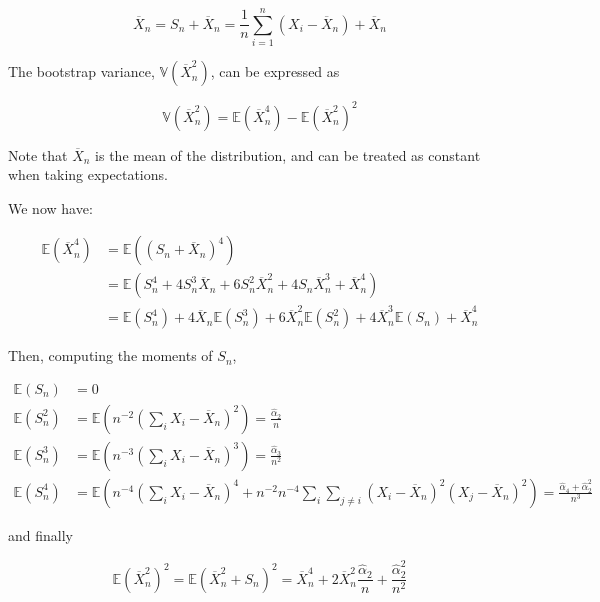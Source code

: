 \[ \overline{X}_{n} = S_{n} + \overline{X}_{n} = \frac{1}{n} \sum_{i=1}^{n} (X_{i} - \overline{X}_{n}) + \overline{X}_{n} \]

The bootstrap variance, \(\mathbb{V}\left(\overline{X}_{n}^{2}\right)\), can
be expressed as

\[ \mathbb{V}\left(\overline{X}_{n}^{2}\right) = \mathbb{E}\left(\overline{X}_{n}^{4}\right) - \mathbb{E}\left(\overline{X}_{n}^{2}\right)^{2} \]

Note that \(\overline{X}_{n}\) is the mean of the distribution, and can be
treated as constant when taking expectations.

We now have:

\begin{align*}
\mathbb{E}\left(\overline{X}_{n}^{4}\right) &= \mathbb{E}\left( (S_{n} + \overline{X}_{n})^{4} \right) \\
&= \mathbb{E}\left( S_{n}^{4} + 4 S_{n}^{3} \overline{X}_{n} + 6 S_{n}^{2} \overline{X}_{n}^{2} + 4 S_{n} \overline{X}_{n}^{3} + \overline{X}_{n}^{4} \right) \\
&= \mathbb{E}(S_{n}^{4}) + 4 \overline{X}_{n} \mathbb{E}(S_{n}^{3}) + 6 \overline{X}_{n}^{2} \mathbb{E}(S_{n}^{2}) + 4 \overline{X}_{n}^{3} \mathbb{E}(S_{n}) + \overline{X}_{n}^{4}
\end{align*}

Then, computing the moments of \(S_{n}\),

\begin{align*}
\mathbb{E}(S_{n}) &= 0 \\
\mathbb{E}(S_{n}^{2}) &= \mathbb{E}\left( n^{-2} \left( \sum_{i} X_{i} - \overline{X}_{n} \right)^{2} \right) = \frac{\hat{\alpha}_{2}}{n} \\
\mathbb{E}(S_{n}^{3}) &= \mathbb{E}\left( n^{-3} \left( \sum_{i} X_{i} - \overline{X}_{n} \right)^{3} \right) = \frac{\hat{\alpha}_{3}}{n^{2}} \\
\mathbb{E}(S_{n}^{4}) &= \mathbb{E}\left( n^{-4} \left( \sum_{i} X_{i} - \overline{X}_{n} \right)^{4} + n^{-2}n^{-4} \sum_{i} \sum_{j \neq i} (X_{i} - \overline{X}_{n})^{2} (X_{j} - \overline{X}_{n})^{2} \right) = \frac{\hat{\alpha}_{4} + \hat{\alpha}_{2}^{2}}{n^{3}}
\end{align*}

and finally

\[
\mathbb{E}\left(\overline{X}_{n}^{2}\right)^{2} = \mathbb{E}\left(\overline{X}_{n}^{2} + S_{n}\right)^{2} = \overline{X}_{n}^{4} + 2 \overline{X}_{n}^{2} \frac{\hat{\alpha}_{2}}{n} + \frac{\hat{\alpha}_{2}^{2}}{n^{2}}
\]

